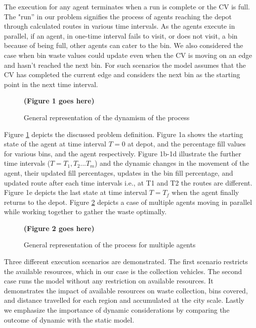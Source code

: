 \documentclass[12pt]{article}
\begin{document}
The execution for any agent terminates when a run is complete or the CV is full. The "run” in our problem signifies the process of agents reaching the depot through calculated routes in various time intervals. As the agents execute in parallel, if an agent, in one-time interval fails to visit, or does not visit, a bin because of being full, other agents can cater to the bin. We also considered the case when bin waste values could update even when the CV is moving on an edge and hasn't reached the next bin. For such scenarios the model assumes that the CV has completed the current edge and considers the next bin as the starting point in the next time interval.  

\begin{figure}[H]
    \centering
    \textbf{(Figure 1 goes here)}
    \caption{General representation of the dynamism of the process}\label{fige}
\end{figure}


Figure \ref{fige} depicts the discussed problem definition. Figure 1a shows the starting state of the agent at time interval $T=0$ at depot, and the percentage fill values for various bins, and the agent respectively. Figure 1b-1d illustrate the further time intervals ($T=T_1,T_2...T_m$) and the dynamic changes in the movement of the agent, their updated fill percentages, updates in the bin fill percentage, and updated route after each time intervals i.e., at T1 and T2 the routes are different. Figure 1e depicts the last state at time interval $T=T_f$ when the agent finally returns to the depot. Figure \ref{fige2} depicts a case of multiple agents moving in parallel while working together to gather the waste optimally.  

\begin{figure}[H]
    \centering
    \textbf{(Figure 2 goes here)}
    \caption{General representation of the process for multiple agents}\label{fige2}
\end{figure}

Three different execution scenarios are demonstrated. The first scenario restricts the available resources, which in our case is the collection vehicles. The second case runs the model without any restriction on available resources. It demonstrates the impact of available resources on waste collection, bins covered, and distance travelled for each region and accumulated at the city scale. Lastly we emphasize the importance of dynamic considerations by comparing the outcome of dynamic with the static model.
\end{document}

